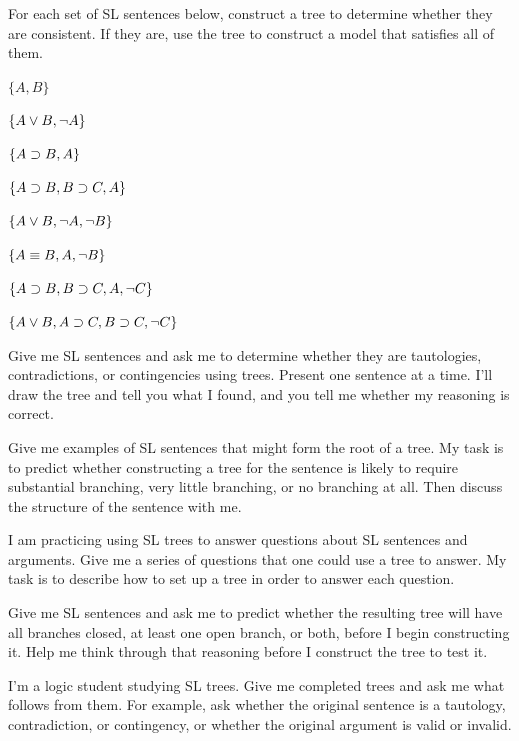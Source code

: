 \problempart
For each set of SL sentences below, construct a tree to determine whether they are consistent. If they are, use the tree to construct a model that satisfies all of them.

\begin{earg}
\item $\{A, B\}$
\item $\{A \vee B, \neg A\}$
\item $\{A \supset B, A\}$
\item $\{A \supset B, B \supset C, A\}$
\item $\{A \vee B, \neg A, \neg B\}$
\item $\{A \equiv B, A, \neg B\}$
\item $\{A \supset B, B \supset C, A, \neg C\}$
\item $\{A \vee B, A \supset C, B \supset C, \neg C\}$
\end{earg}


\begin{genaipractice}[]

\item Give me SL sentences and ask me to determine whether they are tautologies, contradictions, or contingencies using trees. Present one sentence at a time. I'll draw the tree and tell you what I found, and you tell me whether my reasoning is correct.

\item Give me examples of SL sentences that might form the root of a tree. My task is to predict whether constructing a tree for the sentence is likely to require substantial branching, very little branching, or no branching at all. Then discuss the structure of the sentence with me.
\item I am practicing using SL trees to answer questions about SL sentences and arguments. Give me a series of questions that one could use a tree to answer. My task is to describe how to set up a tree in order to answer each question.

\item Give me SL sentences and ask me to predict whether the resulting tree will have all branches closed, at least one open branch, or both, before I begin constructing it. Help me think through that reasoning before I construct the tree to test it.

\item I'm a logic student studying SL trees. Give me completed trees and ask me what follows from them. For example, ask whether the original sentence is a tautology, contradiction, or contingency, or whether the original argument is valid or invalid.


\end{genaipractice}